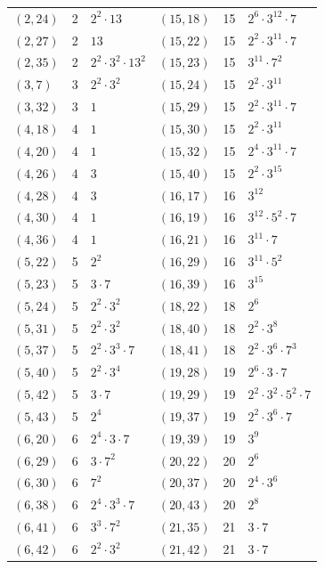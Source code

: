 \documentclass[11pt]{article}
\begin{document}
\begin{longtable}{@{}lrl@{\qquad}lrl@{}}
$(2,24)$ & 2 & $2^{2}\cdot 13$ & $(15,18)$ & 15 & $2^{6}\cdot 3^{12}\cdot 7$\\
$(2,27)$ & 2 & $13$ & $(15,22)$ & 15 & $2^{2}\cdot 3^{11}\cdot 7$\\
$(2,35)$ & 2 & $2^{2}\cdot 3^{2}\cdot 13^{2}$ & $(15,23)$ & 15 & $3^{11}\cdot 7^{2}$\\
$(3,7)$ & 3 & $2^{2}\cdot 3^{2}$ & $(15,24)$ & 15 & $2^{2}\cdot 3^{11}$\\
$(3,32)$ & 3 & $1$ & $(15,29)$ & 15 & $2^{2}\cdot 3^{11}\cdot 7$\\
$(4,18)$ & 4 & $1$ & $(15,30)$ & 15 & $2^{2}\cdot 3^{11}$\\
$(4,20)$ & 4 & $1$ & $(15,32)$ & 15 & $2^{4}\cdot 3^{11}\cdot 7$\\
$(4,26)$ & 4 & $3$ & $(15,40)$ & 15 & $2^{2}\cdot 3^{15}$\\
$(4,28)$ & 4 & $3$ & $(16,17)$ & 16 & $3^{12}$\\
$(4,30)$ & 4 & $1$ & $(16,19)$ & 16 & $3^{12}\cdot 5^{2}\cdot 7$\\
$(4,36)$ & 4 & $1$ & $(16,21)$ & 16 & $3^{11}\cdot 7$\\
$(5,22)$ & 5 & $2^{2}$ & $(16,29)$ & 16 & $3^{11}\cdot 5^{2}$\\
$(5,23)$ & 5 & $3\cdot 7$ & $(16,39)$ & 16 & $3^{15}$\\
$(5,24)$ & 5 & $2^{2}\cdot 3^{2}$ & $(18,22)$ & 18 & $2^{6}$\\
$(5,31)$ & 5 & $2^{2}\cdot 3^{2}$ & $(18,40)$ & 18 & $2^{2}\cdot 3^{8}$\\
$(5,37)$ & 5 & $2^{2}\cdot 3^{3}\cdot 7$ & $(18,41)$ & 18 & $2^{2}\cdot 3^{6}\cdot 7^{3}$\\
$(5,40)$ & 5 & $2^{2}\cdot 3^{4}$ & $(19,28)$ & 19 & $2^{6}\cdot 3\cdot 7$\\
$(5,42)$ & 5 & $3\cdot 7$ & $(19,29)$ & 19 & $2^{2}\cdot 3^{2}\cdot 5^{2}\cdot 7$\\
$(5,43)$ & 5 & $2^{4}$ & $(19,37)$ & 19 & $2^{2}\cdot 3^{6}\cdot 7$\\
$(6,20)$ & 6 & $2^{4}\cdot 3\cdot 7$ & $(19,39)$ & 19 & $3^{9}$\\
$(6,29)$ & 6 & $3\cdot 7^{2}$ & $(20,22)$ & 20 & $2^{6}$\\
$(6,30)$ & 6 & $7^{2}$ & $(20,37)$ & 20 & $2^{4}\cdot 3^{6}$\\
$(6,38)$ & 6 & $2^{4}\cdot 3^{3}\cdot 7$ & $(20,43)$ & 20 & $2^{8}$\\
$(6,41)$ & 6 & $3^{3}\cdot 7^{2}$ & $(21,35)$ & 21 & $3\cdot 7$\\
$(6,42)$ & 6 & $2^{2}\cdot 3^{2}$ & $(21,42)$ & 21 & $3\cdot 7$\\

\end{longtable}
\end{document}
